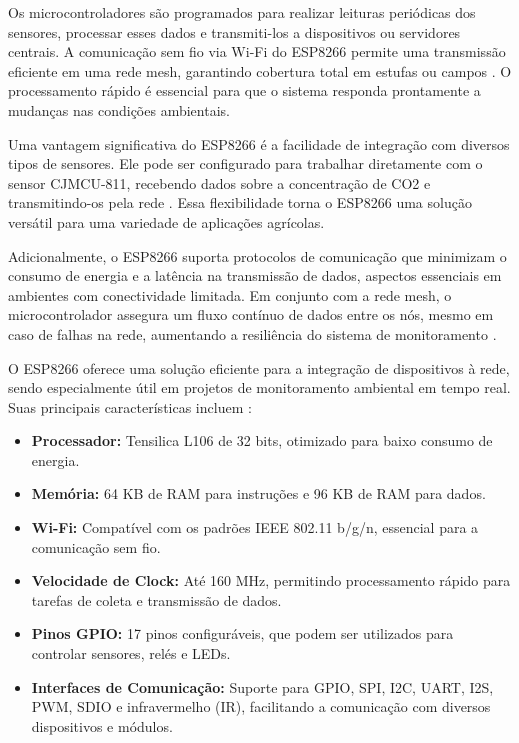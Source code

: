 Os microcontroladores são programados para realizar leituras periódicas dos sensores, processar esses dados e transmiti-los a dispositivos ou servidores centrais. A comunicação sem fio via Wi-Fi do ESP8266 permite uma transmissão eficiente em uma rede mesh, garantindo cobertura total em estufas ou campos \cite{espressif_esp8266}. O processamento rápido é essencial para que o sistema responda prontamente a mudanças nas condições ambientais.

Uma vantagem significativa do ESP8266 é a facilidade de integração com diversos tipos de sensores. Ele pode ser configurado para trabalhar diretamente com o sensor CJMCU-811, recebendo dados sobre a concentração de CO2 e transmitindo-os pela rede \cite{randomnerdtutorials_esp_mesh}. Essa flexibilidade torna o ESP8266 uma solução versátil para uma variedade de aplicações agrícolas.

Adicionalmente, o ESP8266 suporta protocolos de comunicação que minimizam o consumo de energia e a latência na transmissão de dados, aspectos essenciais em ambientes com conectividade limitada. Em conjunto com a rede mesh, o microcontrolador assegura um fluxo contínuo de dados entre os nós, mesmo em caso de falhas na rede, aumentando a resiliência do sistema de monitoramento \cite{makerhero}.

O ESP8266 oferece uma solução eficiente para a integração de dispositivos à rede, sendo especialmente útil em projetos de monitoramento ambiental em tempo real. Suas principais características incluem \cite{espressif_esp8266}:

\begin{itemize}
    \item \textbf{Processador:} Tensilica L106 de 32 bits, otimizado para baixo consumo de energia.
    \item \textbf{Memória:} 64 KB de RAM para instruções e 96 KB de RAM para dados.
    \item \textbf{Wi-Fi:} Compatível com os padrões IEEE 802.11 b/g/n, essencial para a comunicação sem fio.
    \item \textbf{Velocidade de Clock:} Até 160 MHz, permitindo processamento rápido para tarefas de coleta e transmissão de dados.
    \item \textbf{Pinos GPIO:} 17 pinos configuráveis, que podem ser utilizados para controlar sensores, relés e LEDs.
    \item \textbf{Interfaces de Comunicação:} Suporte para GPIO, SPI, I2C, UART, I2S, PWM, SDIO e infravermelho (IR), facilitando a comunicação com diversos dispositivos e módulos.
\end{itemize}

